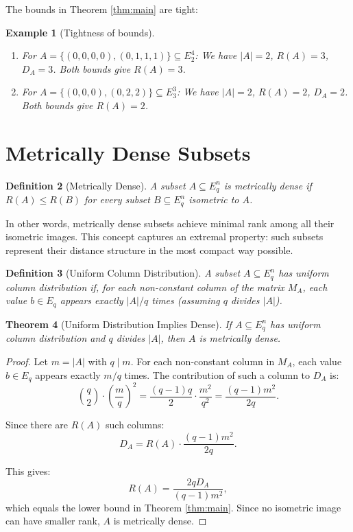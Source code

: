 \documentclass[12pt]{article}
\newtheorem{theorem}{Theorem}[section]
\newtheorem{definition}[theorem]{Definition}
\newtheorem{example}[theorem]{Example}
\newcommand{\Eq}{E_q}
\newcommand{\Eqn}{E_q^n}
\renewcommand{\leq}{\leqslant}
\begin{document}
The bounds in Theorem \ref{thm:main} are tight:

\begin{example}[Tightness of bounds]
\begin{enumerate}
\item For $A = \{(0,0,0,0), (0,1,1,1)\} \subseteq E_2^4$: We have $|A| = 2$, $R(A) = 3$, $D_A = 3$. Both bounds give $R(A) = 3$.

\item For $A = \{(0,0,0), (0,2,2)\} \subseteq E_3^3$: We have $|A| = 2$, $R(A) = 2$, $D_A = 2$. Both bounds give $R(A) = 2$.
\end{enumerate}
\end{example}

\section{Metrically Dense Subsets}
\label{sec:dense}

\begin{definition}[Metrically Dense]
\label{def:dense}
A subset $A \subseteq \Eqn$ is \emph{metrically dense} if $R(A) \leq R(B)$ for every subset $B \subseteq \Eqn$ isometric to $A$.
\end{definition}

In other words, metrically dense subsets achieve minimal rank among all their isometric images. This concept captures an extremal property: such subsets represent their distance structure in the most compact way possible.

\begin{definition}[Uniform Column Distribution]
\label{def:uniform}
A subset $A \subseteq \Eqn$ has \emph{uniform column distribution} if, for each non-constant column of the matrix $M_A$, each value $b \in \Eq$ appears exactly $|A|/q$ times (assuming $q$ divides $|A|$).
\end{definition}

\begin{theorem}[Uniform Distribution Implies Dense]
\label{thm:uniform}
If $A \subseteq \Eqn$ has uniform column distribution and $q$ divides $|A|$, then $A$ is metrically dense.
\end{theorem}

\begin{proof}
Let $m = |A|$ with $q \mid m$. For each non-constant column in $M_A$, each value $b \in \Eq$ appears exactly $m/q$ times. The contribution of such a column to $D_A$ is:
\[
\binom{q}{2} \cdot \left(\frac{m}{q}\right)^2 = \frac{(q-1)q}{2} \cdot \frac{m^2}{q^2} = \frac{(q-1)m^2}{2q}.
\]

Since there are $R(A)$ such columns:
\[
D_A = R(A) \cdot \frac{(q-1)m^2}{2q}.
\]

This gives:
\[
R(A) = \frac{2qD_A}{(q-1)m^2},
\]
which equals the lower bound in Theorem \ref{thm:main}. Since no isometric image can have smaller rank, $A$ is metrically dense.
\end{proof}
\end{document}
